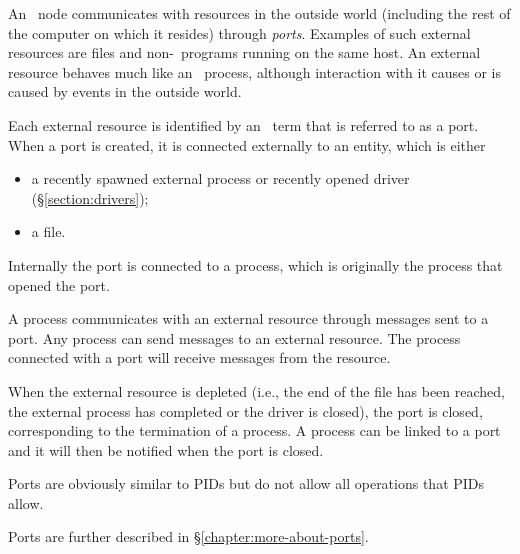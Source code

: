 \label{section:ports}

An \Erlang\ node communicates with resources
in the outside world (including the rest of the computer on which it
resides) through \emph{ports}.  Examples of such external resources
are files and non-\Erlang\ programs running on the same host.  An
external resource behaves much like an \Erlang\ process, although
interaction with it causes or is caused by events in the outside
world.

Each external resource is identified by an \Erlang\ term that is
referred to as a port.  When a port is created, it is connected
externally to an entity, which is either
\begin{itemize}
\item a recently spawned external process or recently opened driver
      (\S\ref{section:drivers});
\item a file.
\end{itemize}
Internally the port is connected to a process, which is originally the
process that opened the port.

A process communicates with an external resource through messages sent
to a port.  Any process can send messages to an external resource.
The process connected with a port will receive messages from the
resource.

When the external resource is depleted (i.e., the end of the file has
been reached, the external process has completed or the driver is
closed), the port is closed, corresponding to the termination of a
process.  A process can be linked to a port and it will then be
notified when the port is closed.

Ports are obviously similar to PIDs but do not allow all operations
that PIDs allow.

Ports are further described in \S\ref{chapter:more-about-ports}.

